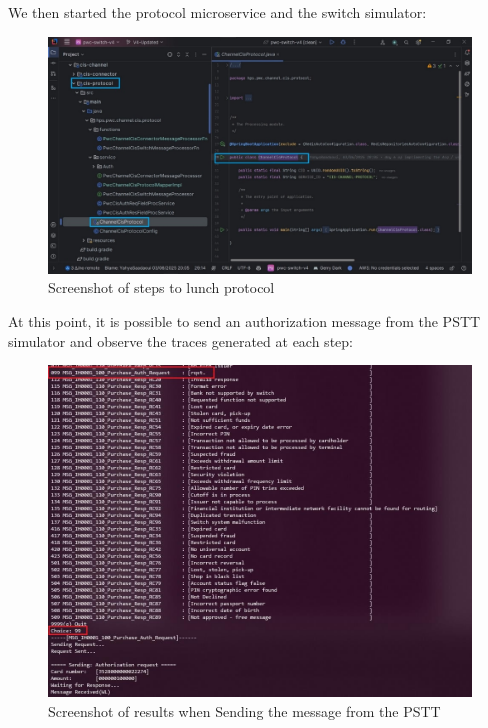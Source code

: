 \documentclass[12pt,a4paper]{report}
\begin{document}
We then started the protocol microservice and the switch simulator:

\begin{figure}[H]
\centering
\includegraphics[width=\textwidth,height=\textheight,keepaspectratio]{media/image75.jpeg}
\caption{Screenshot of steps to
lunch protocol}
\label{fig:SLP}
\end{figure} 

At this point, it is possible to send an authorization message from the
PSTT simulator and observe the traces generated at each step:

\begin{figure}[H]
\centering
\includegraphics[width=\textwidth,height=\textheight,keepaspectratio]{media/image76.jpeg}
\caption{Screenshot of results
when Sending the message from the PSTT}
\label{fig:SMP}
\end{figure} 
\end{document}
